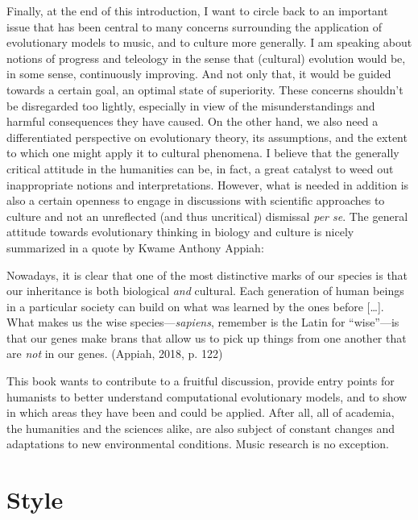 \documentclass[
  a4paperpaper,
  ,captions=tableheading
]{scrbook}
\renewenvironment{quote}{\begin{customblockquote}\list{}{\rightmargin=0em\leftmargin=0em}%
\item\relax\color{blockquote-text}\ignorespaces}{\unskip\unskip\endlist\end{customblockquote}}
\begin{document}
Finally, at the end of this introduction, I want to circle back to an
important issue that has been central to many concerns surrounding the
application of evolutionary models to music, and to culture more
generally. I am speaking about notions of progress and teleology in the
sense that (cultural) evolution would be, in some sense, continuously
improving. And not only that, it would be guided towards a certain goal,
an optimal state of superiority. These concerns shouldn't be disregarded
too lightly, especially in view of the misunderstandings and harmful
consequences they have caused. On the other hand, we also need a
differentiated perspective on evolutionary theory, its assumptions, and
the extent to which one might apply it to cultural phenomena. I believe
that the generally critical attitude in the humanities can be, in fact,
a great catalyst to weed out inappropriate notions and interpretations.
However, what is needed in addition is also a certain openness to engage
in discussions with scientific approaches to culture and not an
unreflected (and thus uncritical) dismissal \emph{per se}. The general
attitude towards evolutionary thinking in biology and culture is nicely
summarized in a quote by Kwame Anthony Appiah:

\begin{quote}
Nowadays, it is clear that one of the most distinctive marks of our
species is that our inheritance is both biological \emph{and} cultural.
Each generation of human beings in a particular society can build on
what was learned by the ones before {[}\ldots{]}. What makes us the wise
species---\emph{sapiens}, remember is the Latin for ``wise''---is that
our genes make brans that allow us to pick up things from one another
that are \emph{not} in our genes. (Appiah, 2018, p. 122)
\end{quote}

This book wants to contribute to a fruitful discussion, provide entry
points for humanists to better understand computational evolutionary
models, and to show in which areas they have been and could be applied.
After all, all of academia, the humanities and the sciences alike, are
also subject of constant changes and adaptations to new environmental
conditions. Music research is no exception.

\hypertarget{style}{%
\chapter{Style}\label{style}}
\end{document}
